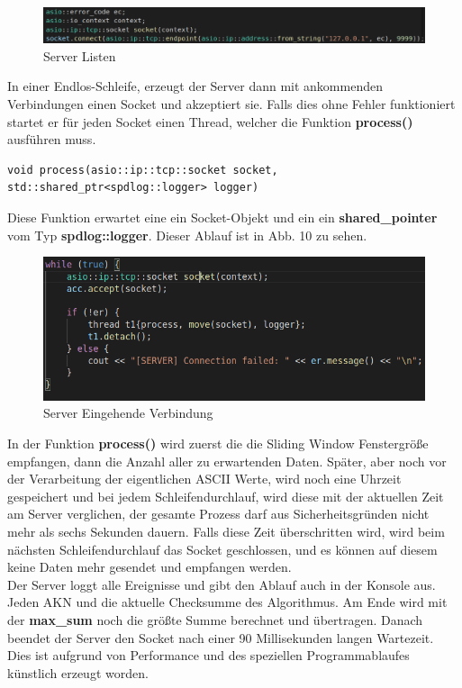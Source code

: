 \documentclass{article}
\begin{document}
\begin{center}
\begin{figure}[h]
    \centering
    \includegraphics[width=\textwidth]{clientep.png}
    \caption{Server Listen}
\end{figure}
\end{center}

In einer Endlos-Schleife, erzeugt der Server dann mit ankommenden Verbindungen einen Socket und akzeptiert sie. Falls dies ohne Fehler funktioniert startet er für jeden Socket einen Thread, welcher die Funktion \textbf{process()} ausführen muss.

\begin{lstlisting}
void process(asio::ip::tcp::socket socket,
std::shared_ptr<spdlog::logger> logger)
\end{lstlisting}

Diese Funktion erwartet eine ein Socket-Objekt und ein ein \textbf{shared\_pointer} vom Typ \textbf{spdlog::logger}. Dieser Ablauf ist in Abb. 10 zu sehen.

\begin{center}
\begin{figure}[h]
    \centering
    \includegraphics[width=\textwidth]{servercon.png}
    \caption{Server Eingehende Verbindung}
\end{figure}
\end{center}

In der Funktion \textbf{process()} wird zuerst die die Sliding Window Fenstergröße empfangen, dann die Anzahl aller zu erwartenden Daten. Später, aber noch vor der Verarbeitung der eigentlichen ASCII Werte, wird noch eine Uhrzeit gespeichert und bei jedem Schleifendurchlauf, wird diese mit der aktuellen Zeit am Server verglichen, der gesamte Prozess darf aus Sicherheitsgründen nicht mehr als sechs Sekunden dauern. Falls diese Zeit überschritten wird, wird beim nächsten Schleifendurchlauf das Socket geschlossen, und es können auf diesem keine Daten mehr gesendet und empfangen werden.\\
Der Server loggt alle Ereignisse und gibt den Ablauf auch in der Konsole aus. Jeden AKN und die aktuelle Checksumme des Algorithmus. Am Ende wird mit der \textbf{max\_sum} noch die größte Summe berechnet und übertragen. Danach beendet der Server den Socket nach einer 90 Millisekunden langen Wartezeit. Dies ist aufgrund von Performance und des speziellen Programmablaufes künstlich erzeugt worden.
\end{document}
